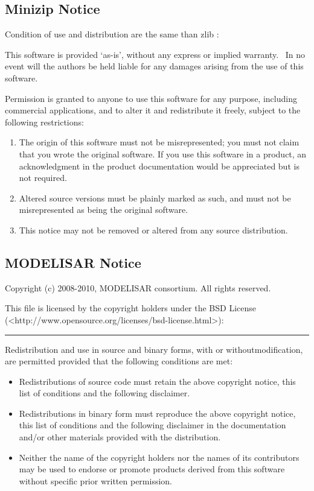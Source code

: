 \subsection{Minizip Notice}\label{minizip-notice}

Condition of use and distribution are the same than zlib :

This software is provided `as-is', without any express or implied warranty.~ In no event will the authors be held liable for any damages arising from the use of this software.

Permission is granted to anyone to use this software for any purpose, including commercial applications, and to alter it and redistribute it freely, subject to the following restrictions:

\begin{enumerate}
\def\labelenumi{\arabic{enumi}.}
\item
  The origin of this software must not be misrepresented; you must not claim that you wrote the original software. If you use this software in a product, an acknowledgment in the product documentation would be appreciated but is not required.
\item
  Altered source versions must be plainly marked as such, and must not be misrepresented as being the original software.
\item
  This notice may not be removed or altered from any source distribution.
\end{enumerate}

\subsection{MODELISAR Notice}\label{modelisar-notice}

Copyright (c) 2008-2010, MODELISAR consortium. All rights reserved.

This file is licensed by the copyright holders under the BSD License (\textless{}http://www.opensource.org/licenses/bsd-license.html\textgreater{}):

\begin{center}\rule{0.5\linewidth}{\linethickness}\end{center}

Redistribution and use in source and binary forms, with or withoutmodification, are permitted provided that the following conditions are met:

\begin{itemize}
\item
  Redistributions of source code must retain the above copyright notice, this list of conditions and the following disclaimer.
\item
  Redistributions in binary form must reproduce the above copyright notice, this list of conditions and the following disclaimer in the documentation and/or other materials provided with the distribution.
\item
  Neither the name of the copyright holders nor the names of its contributors may be used to endorse or promote products derived from this software without specific prior written permission.
\end{itemize}


